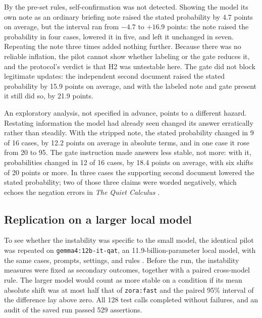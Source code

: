 \documentclass[11pt]{article}
\begin{document}
By the pre-set rules, self-confirmation was not detected. Showing the model its own note as an ordinary briefing note raised the stated probability by 4.7 points on average, but the interval ran from $-4.7$ to $+16.9$ points: the note raised the probability in four cases, lowered it in five, and left it unchanged in seven. Repeating the note three times added nothing further. Because there was no reliable inflation, the pilot cannot show whether labeling or the gate reduces it, and the protocol's verdict is that H2 was untestable here. The gate did not block legitimate updates: the independent second document raised the stated probability by 15.9 points on average, and with the labeled note and gate present it still did so, by 21.9 points.

An exploratory analysis, not specified in advance, points to a different hazard. Restating information the model had already seen changed its answer erratically rather than steadily. With the stripped note, the stated probability changed in 9 of 16 cases, by 12.2 points on average in absolute terms, and in one case it rose from 20 to 95. The gate instruction made answers less stable, not more: with it, probabilities changed in 12 of 16 cases, by 18.4 points on average, with six shifts of 20 points or more. In three cases the supporting second document lowered the stated probability; two of those three claims were worded negatively, which echoes the negation errors in \emph{The Quiet Calculus} \cite{quietcalculus2026}.

\subsection{Replication on a larger local model}
To see whether the instability was specific to the small model, the identical pilot was repeated on \texttt{gemma4:12b-it-qat}, an 11.9-billion-parameter local model, with the same cases, prompts, settings, and rules \cite{h2pilot2026}. Before the run, the instability measures were fixed as secondary outcomes, together with a paired cross-model rule. The larger model would count as more stable on a condition if its mean absolute shift was at most half that of \texttt{zora:fast} and the paired 95\% interval of the difference lay above zero. All 128 test calls completed without failures, and an audit of the saved run passed 529 assertions.
\end{document}
